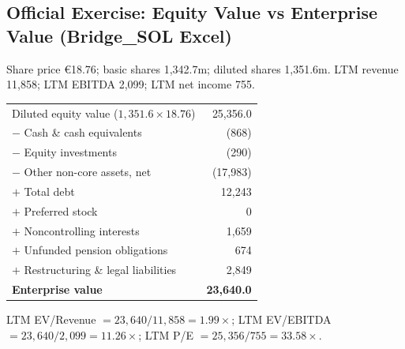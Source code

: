 \subsection{Official Exercise: Equity Value vs Enterprise Value (Bridge\_SOL Excel)}

\begin{exbox}
Share price \euro18.76; basic shares 1,342.7m; diluted shares 1,351.6m. LTM revenue 11,858; LTM EBITDA 2,099; LTM net income 755.
\begin{center}
\small
\begin{tabular}{@{}lr@{}}
\toprule
Diluted equity value ($1{,}351.6\times18.76$) & 25,356.0\\
$-$ Cash \& cash equivalents & (868)\\
$-$ Equity investments & (290)\\
$-$ Other non-core assets, net & (17,983)\\
$+$ Total debt & 12,243\\
$+$ Preferred stock & 0\\
$+$ Noncontrolling interests & 1,659\\
$+$ Unfunded pension obligations & 674\\
$+$ Restructuring \& legal liabilities & 2,849\\
\midrule
\textbf{Enterprise value} & \textbf{23,640.0}\\
\bottomrule
\end{tabular}
\end{center}
LTM EV/Revenue $=23{,}640/11{,}858=\mathbf{1.99\times}$; LTM EV/EBITDA $=23{,}640/2{,}099=\mathbf{11.26\times}$; LTM P/E $=25{,}356/755=\mathbf{33.58\times}$.
\end{exbox}

